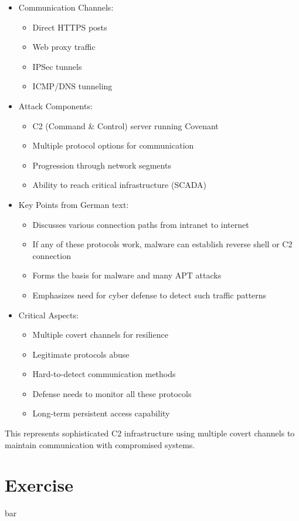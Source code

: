 \begin{itemize}
	\item Communication Channels:
    \begin{itemize}
        \tightlist
		\item Direct HTTPS posts
		\item Web proxy traffic
		\item IPSec tunnels
		\item ICMP/DNS tunneling
    \end{itemize}

	\item Attack Components:
    \begin{itemize}
        \tightlist
		\item C2 (Command \& Control) server running Covenant
		\item Multiple protocol options for communication
		\item Progression through network segments
		\item Ability to reach critical infrastructure (SCADA)
    \end{itemize}

	\item Key Points from German text:
    \begin{itemize}
        \tightlist
		\item Discusses various connection paths from intranet to internet
		\item If any of these protocols work, malware can establish reverse shell or C2 connection
		\item Forms the basis for malware and many APT attacks
		\item Emphasizes need for cyber defense to detect such traffic patterns
    \end{itemize}

	\item Critical Aspects:
    \begin{itemize}
        \tightlist
		\item Multiple covert channels for resilience
		\item Legitimate protocols abuse
		\item Hard-to-detect communication methods
		\item Defense needs to monitor all these protocols
		\item Long-term persistent access capability
    \end{itemize}
\end{itemize}

This represents sophisticated C2 infrastructure using multiple covert channels to maintain communication with compromised systems.

\section{Exercise}
bar
